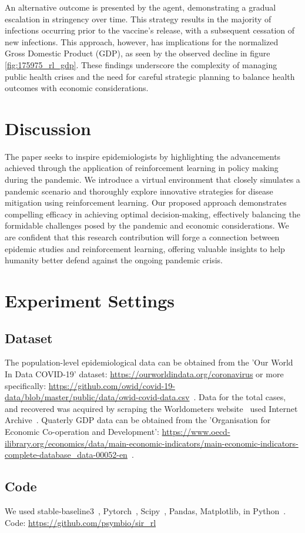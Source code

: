 \documentclass[tikz,fleqn,12pt]{wlscirep}
\begin{document}
An alternative outcome is presented by the agent, demonstrating a gradual escalation in stringency over time. This strategy results in the majority of infections occurring prior to the vaccine's release, with a subsequent cessation of new infections. This approach, however, has implications for the normalized Gross Domestic Product (GDP), as seen by the observed decline in figure \cref{fig:175975_rl_gdp}. These findings underscore the complexity of managing public health crises and the need for careful strategic planning to balance health outcomes with economic considerations.

\section{Discussion}
The paper seeks to inspire epidemiologists by highlighting the advancements achieved through the application of reinforcement learning in policy making during the pandemic. We introduce a virtual environment that closely simulates a pandemic scenario and thoroughly explore innovative strategies for disease mitigation using reinforcement learning. Our proposed approach demonstrates compelling efficacy in achieving optimal decision-making, effectively balancing the formidable challenges posed by the pandemic and economic considerations. We are confident that this research contribution will forge a connection between epidemic studies and reinforcement learning, offering valuable insights to help humanity better defend against the ongoing pandemic crisis.

\section{Experiment Settings}
\subsection{Dataset}
The population-level epidemiological data can be obtained from the 'Our World In Data COVID-19' dataset: \url{https://ourworldindata.org/coronavirus} or more specifically: \url{https://github.com/owid/covid-19-data/blob/master/public/data/owid-covid-data.csv}~\cite{owidcoronavirus}. Data for the total cases, and recovered was acquired by scraping the Worldometers website~\cite{WorldometerCorona} used Internet Archive~\cite{InternetArchive}. Quaterly GDP data can be obtained from the 'Organisation for Economic Co-operation and Development': \url{https://www.oecd-ilibrary.org/economics/data/main-economic-indicators/main-economic-indicators-complete-database_data-00052-en}~\cite{economic_indicators_data}.

\subsection{Code}
We used stable-baseline3~\cite{JMLR:v22:20-1364}, Pytorch~\cite{paszke2019pytorch}, Scipy~\cite{Virtanen_2020}, Pandas, Matplotlib, in Python~\cite{ScientificPython}.
Code: \url{https://github.com/psymbio/sir_rl}
% 

\end{document}
